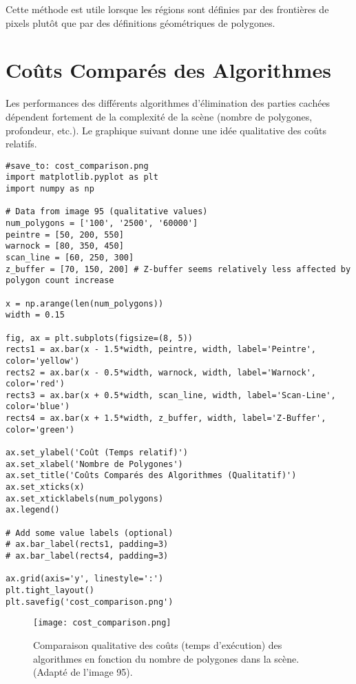 \documentclass{article}
\begin{document}
Cette méthode est utile lorsque les régions sont définies par des frontières de pixels plutôt que par des définitions géométriques de polygones.


\section{Coûts Comparés des Algorithmes}

Les performances des différents algorithmes d'élimination des parties cachées dépendent fortement de la complexité de la scène (nombre de polygones, profondeur, etc.). Le graphique suivant donne une idée qualitative des coûts relatifs.

\begin{verbatim}
#save_to: cost_comparison.png
import matplotlib.pyplot as plt
import numpy as np

# Data from image 95 (qualitative values)
num_polygons = ['100', '2500', '60000']
peintre = [50, 200, 550]
warnock = [80, 350, 450]
scan_line = [60, 250, 300]
z_buffer = [70, 150, 200] # Z-buffer seems relatively less affected by polygon count increase

x = np.arange(len(num_polygons))
width = 0.15

fig, ax = plt.subplots(figsize=(8, 5))
rects1 = ax.bar(x - 1.5*width, peintre, width, label='Peintre', color='yellow')
rects2 = ax.bar(x - 0.5*width, warnock, width, label='Warnock', color='red')
rects3 = ax.bar(x + 0.5*width, scan_line, width, label='Scan-Line', color='blue')
rects4 = ax.bar(x + 1.5*width, z_buffer, width, label='Z-Buffer', color='green')

ax.set_ylabel('Coût (Temps relatif)')
ax.set_xlabel('Nombre de Polygones')
ax.set_title('Coûts Comparés des Algorithmes (Qualitatif)')
ax.set_xticks(x)
ax.set_xticklabels(num_polygons)
ax.legend()

# Add some value labels (optional)
# ax.bar_label(rects1, padding=3)
# ax.bar_label(rects4, padding=3)

ax.grid(axis='y', linestyle=':')
plt.tight_layout()
plt.savefig('cost_comparison.png')
\end{verbatim}

\begin{figure}[H]
\centering
\texttt{[image: cost\_comparison.png]}
\caption{Comparaison qualitative des coûts (temps d'exécution) des algorithmes en fonction du nombre de polygones dans la scène. (Adapté de l'image 95).}
\label{fig:cost_comparison}
\end{figure}
\end{document}
